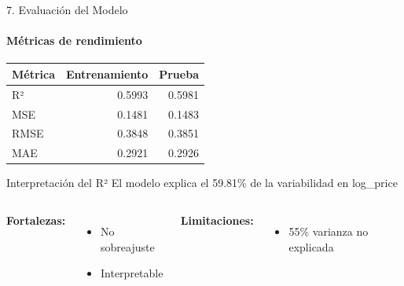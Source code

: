 \documentclass{beamer}
\begin{document}
\begin{frame}{7. Evaluación del Modelo}
  \framesubtitle{Métricas de rendimiento}
  
  \begin{center}
    \begin{tabular}{lrr}
      \toprule
      \textbf{Métrica} & \textbf{Entrenamiento} & \textbf{Prueba} \\
      \midrule
      R² & 0.5993 & 0.5981 \\
      MSE & 0.1481 & 0.1483 \\
      RMSE & 0.3848 & 0.3851 \\
      MAE & 0.2921 & 0.2926 \\
      \bottomrule
    \end{tabular}
  \end{center}
  
  \vspace{0.3cm}
  
  \begin{block}{Interpretación del R²}
    El modelo explica el \alert{59.81\%} de la variabilidad en log\_price
  \end{block}
  
  \vspace{0.2cm}
  
  \begin{columns}
      \textbf{Fortalezas:}
      \begin{itemize}
        \item[$\checkmark$] No sobreajuste
        \item[$\checkmark$] Interpretable
      \end{itemize}
    
      \textbf{Limitaciones:}
      \begin{itemize}
        \item[$\times$] 55\% varianza no explicada
      \end{itemize}
  \end{columns}
\end{frame}
\end{document}
